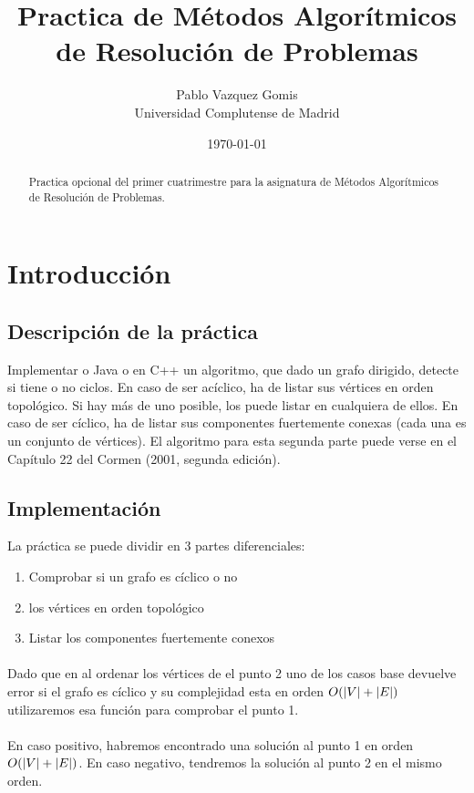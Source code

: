 \documentclass{article}
\title{Practica de Métodos Algorítmicos de Resolución de Problemas}
\author{Pablo Vazquez Gomis  \\
	Universidad Complutense de Madrid \\
	}
\date{\today}
\DeclarePairedDelimiter\abs{\lvert}{\rvert}%
\begin{document}
\maketitle


\begin{abstract}
Practica opcional del primer cuatrimestre para la asignatura de Métodos Algorítmicos de Resolución de Problemas.
\end{abstract}

\section{Introducción}
\subsection{Descripción de la práctica}
Implementar o Java o en C++ un algoritmo, que dado un grafo dirigido, detecte si tiene o no
ciclos. En caso de ser acíclico, ha de listar sus vértices en orden topológico. Si hay más de uno
posible, los puede listar en cualquiera de ellos. En caso de ser cíclico, ha de listar sus componentes
fuertemente conexas (cada una es un conjunto de vértices). El algoritmo para esta segunda parte
puede verse en el Capítulo 22 del Cormen (2001, segunda edición).

\subsection{Implementación}

La práctica se puede dividir en 3 partes diferenciales:
\begin{enumerate}
\item \label{1} Comprobar si un grafo es cíclico o no
\item \label{2} los vértices en orden topológico
\item Listar los componentes fuertemente conexos 
\end{enumerate}

\paragraph{}Dado que en al ordenar los vértices de el punto 2 uno de los casos base devuelve error si el
grafo es cíclico y su complejidad esta en orden $ O(\abs{V} + \abs{E}) $ utilizaremos esa función para comprobar el punto 1.

\paragraph{}En caso positivo, habremos encontrado una solución al punto 1 en orden $ O(\abs{V} + \abs{E}) $. En caso negativo, tendremos la solución al punto 2
en el mismo orden.
\end{document}
